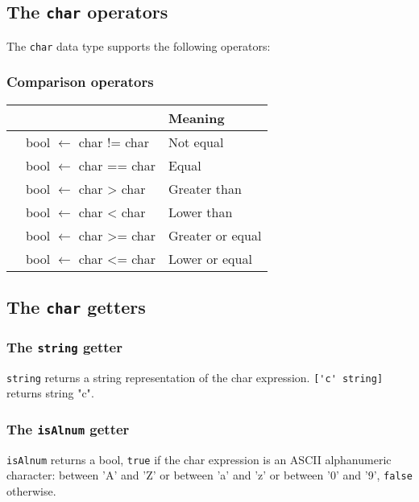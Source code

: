 \documentclass[10pt,openright,twosides,final]{memoir}
\newcommand{\ccst}[1]{{\footnotesize\ttfamily\colorbox{light-blue}{'#1'}}}
\newcommand{\scst}[1]{{\footnotesize\ttfamily\colorbox{light-blue}{"#1"}}}
\newcommand{\gtlinline}[1]{\colorbox{light-blue}{\lstinline[language=gtl]{#1}}}
\begin{document}
\subsection{The \texttt{char} operators}

The \lstinline{char} data type supports the following operators:

\subsubsection{Comparison operators}

\begin{longtable}{>{\ttfamily}l|>{\ttfamily}l|l}
{\bfseries Operator}&{\bfseries Expression type}&{\bfseries Meaning}\\
\hline\endhead
 {!=}&
  {bool $\leftarrow$ char != char}&
  {Not equal}\\
 {==}&
  {bool $\leftarrow$ char == char}&
  {Equal}\\
 {>}&
  {bool $\leftarrow$ char > char}&
  {Greater than}\\
 {<}&
  {bool $\leftarrow$ char < char}&
  {Lower than}\\
 {>=}&
  {bool $\leftarrow$ char >= char}&
  {Greater or equal}\\
 {<=}&
  {bool $\leftarrow$ char <= char}&
  {Lower or equal}\\
\end{longtable}

\subsection{The \texttt{char} getters}

\subsubsection{The \texttt{string} getter}

\gtlinline{string} returns a string representation of the char expression. \gtlinline{['c' string]} returns string \scst{c}.

\subsubsection{The \texttt{isAlnum} getter}

\gtlinline{isAlnum} returns a bool, \gtlinline{true} if the char expression is an ASCII alphanumeric character: between \ccst{A} and \ccst{Z} or between \ccst{a} and \ccst{z} or between \ccst{0} and \ccst{9}, \gtlinline{false} otherwise.
\end{document}
